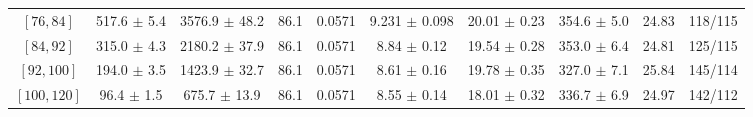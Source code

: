 \begin{tabular}{c||c|c|c|c|c|c|c||c|c}
$[76, 84]$ & 517.6 $\pm$ 5.4 & 3576.9 $\pm$ 48.2 & 86.1 & 0.0571 & 9.231 $\pm$ 0.098 & 20.01 $\pm$ 0.23 & 354.6 $\pm$ 5.0 & 24.83 & 118/115\\
$[84, 92]$ & 315.0 $\pm$ 4.3 & 2180.2 $\pm$ 37.9 & 86.1 & 0.0571 & 8.84 $\pm$ 0.12 & 19.54 $\pm$ 0.28 & 353.0 $\pm$ 6.4 & 24.81 & 125/115\\
$[92, 100]$ & 194.0 $\pm$ 3.5 & 1423.9 $\pm$ 32.7 & 86.1 & 0.0571 & 8.61 $\pm$ 0.16 & 19.78 $\pm$ 0.35 & 327.0 $\pm$ 7.1 & 25.84 & 145/114\\
$[100, 120]$ & 96.4 $\pm$ 1.5 & 675.7 $\pm$ 13.9 & 86.1 & 0.0571 & 8.55 $\pm$ 0.14 & 18.01 $\pm$ 0.32 & 336.7 $\pm$ 6.9 & 24.97 & 142/112\\
\end{tabular}
